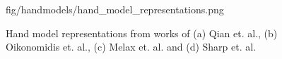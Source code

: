 \begin{figure}[t!]
\centering
\begin{overpic} 
[width=\linewidth]
{fig/handmodels/hand_model_representations.png}
\end{overpic}
\caption{Hand model representations from works of (a) Qian et. al., (b)  Oikonomidis et. al., (c) Melax et. al.  and (d) Sharp et. al. }
\label{fig:onecol}
\end{figure}

